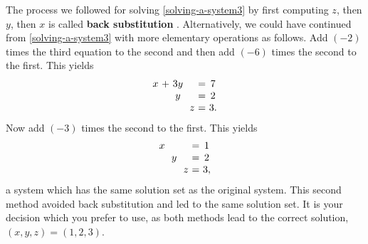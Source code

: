 \begin{solution}
  The process we followed for solving \eqref{solving-a-system3} by
  first computing $z$, then $y$, then $x$ is called \textbf{back
    substitution}%
  .  Alternatively, we could have continued
  from \eqref{solving-a-system3} with more elementary operations as
  follows. Add $(-2)$ times the third equation to the second and then
  add $(-6)$ times the second to the first. This yields
  \begin{equation*}
    \allowbreak
    \begin{array}{c@{~}c@{~}c@{~}c@{~}c@{~}c@{~}c}
      x&+&3y&&&=&7 \\
       &&y&&&=&2 \\
       &&&&z&=&3.
    \end{array}
  \end{equation*}
  Now add $(-3)$ times the second to the first. This yields
  \begin{equation*}
    \allowbreak
    \begin{array}{c@{~}c@{~}c@{~}c@{~}c@{~}c@{~}c}
      x&&&&&=&1 \\
       &&y&&&=&2 \\
       &&&&z&=&3,
    \end{array}
  \end{equation*}
  a system which has the same solution set as the original
  system. This second method avoided back substitution and led to the
  same solution set. It is your decision which you prefer to use, as
  both methods lead to the correct solution,
  $(x,y,z) = (1,2,3)$.
\end{solution}

